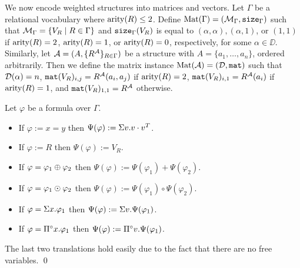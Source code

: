We now encode weighted structures into matrices and vectors. Let $\Gamma$ be a relational vocabulary 
where $\operatorname{arity}(R) \leq 2$. 
Define $\text{Mat}(\Gamma) = (\mathcal{M}_\Gamma,\texttt{size}_\Gamma)$ such 
that $\mathcal{M}_\Gamma = \{ V_{R} \mid R \in \Gamma\}$ and $\texttt{size}_\Gamma(V_{R})$ is equal to 
$(\alpha, \alpha), (\alpha, 1)$, or $(1,1)$ if $\operatorname{arity}(R)=2$, $\operatorname{arity}(R)=1$, or $\operatorname{arity}(R)=0$, 
respectively, for some $\alpha \in \DD$. Similarly, let $\mathcal{A} = (A, \{R^{\mathcal{A}}\}_{R \in \Gamma})$ 
be a structure with $A = \{a_1, \ldots, a_n\}$, ordered arbitrarily.
Then we define the matrix instance $\text{Mat}(\mathcal{A}) = (\mathcal{D},\texttt{mat})$ such that $\mathcal{D}(\alpha) = n$, 
$\texttt{mat}(V_{R})_{i,j} = R^{\mathcal{A}}(a_i, a_j)$ if $\operatorname{arity}(R)=2$, $\texttt{mat}(V_{R})_{i,1} = R^{\mathcal{A}}(a_i)$ if $\operatorname{arity}(R)=1$, 
and $\texttt{mat}(V_{R})_{1,1} = R^{\mathcal{A}}$ otherwise.

Let $\varphi$ be a formula over $\Gamma$.
\begin{itemize}
  \item If $\varphi:=x=y$ then $\Psi(\varphi):= \Sigma v.v\cdot v^T$.
  \item If $\varphi:=R$ then $\Psi(\varphi):=V_R$.
  \item If $\varphi = \varphi_1 \oplus \varphi_2$ then $\Psi(\varphi):=\Psi(\varphi_1) + \Psi(\varphi_2)$.
  \item If $\varphi = \varphi_1 \odot \varphi_2$ then $\Psi(\varphi):=\Psi(\varphi_1) \circ \Psi(\varphi_2)$.
  \item If $\varphi = \Sigma x. \varphi_1$ then $\Psi(\varphi):=\Sigma v.\Psi(\varphi_1)$.
  \item If $\varphi = \Pi^{\circ} x. \varphi_1$ then $\Psi(\varphi):=\Pi^{\circ} v.\Psi(\varphi_1)$.
\end{itemize}

The last two translations hold easily due to the fact that there are no free variables.
\qed